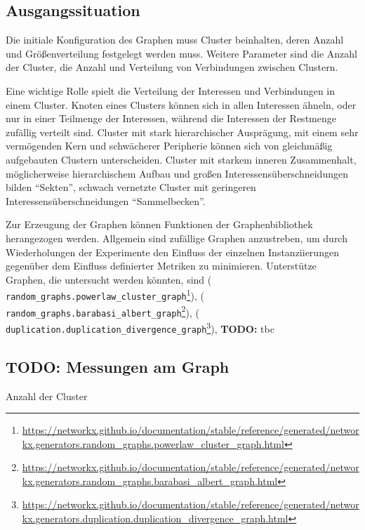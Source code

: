\documentclass[11pt, a4paper]{scrartcl}
\newcommand{\nx}[1]{\texttt{#1}}
\newcommand*{\ToDo}[1]{{\color{ToDoColor}\textbf{TODO:} #1}}
\begin{document}
\subsection{Ausgangssituation}
Die initiale Konfiguration des Graphen muss Cluster beinhalten, deren Anzahl und Größenverteilung festgelegt werden muss. Weitere Parameter sind die Anzahl der Cluster, die Anzahl und Verteilung von Verbindungen zwischen Clustern.

Eine wichtige Rolle spielt die Verteilung der Interessen und Verbindungen in einem Cluster. Knoten eines Clusters können sich in allen Interessen ähneln, oder nur in einer Teilmenge der Interessen, während die Interessen der Restmenge zufällig verteilt sind. Cluster mit stark hierarchischer Ausprägung, mit einem sehr vermögenden Kern und schwächerer Peripherie können sich von gleichmäßig aufgebauten Clustern unterscheiden. Cluster mit starkem inneren Zusammenhalt, möglicherweise hierarchischem Aufbau und großen Interessensüberschneidungen bilden "`Sekten"', schwach vernetzte Cluster mit geringeren Interessensüberschneidungen "`Sammelbecken"'.

Zur Erzeugung der Graphen können Funktionen der Graphenbibliothek \autocite{networkx} herangezogen werden. Allgemein sind zufällige Graphen anzustreben, um durch Wiederholungen der Experimente den Einfluss der einzelnen Instanziierungen gegenüber dem Einfluss definierter Metriken zu minimieren.
Unterstütze Graphen, die untersucht werden könnten, sind \autocite{Holme2002} (\nx{%
random\_graphs.powerlaw\_cluster\_graph}\footnote{\url{https://networkx.github.io/documentation/stable/reference/generated/networkx.generators.random_graphs.powerlaw_cluster_graph.html}}), \autocite{Barabasi509} (\nx{%
random\_graphs.barabasi\_albert\_graph}\footnote{\url{https://networkx.github.io/documentation/stable/reference/generated/networkx.generators.random_graphs.barabasi_albert_graph.html}}), \autocite{Ispolatov2005} (\nx{%
duplication.duplication\_divergence\_graph}\footnote{\url{https://networkx.github.io/documentation/stable/reference/generated/networkx.generators.duplication.duplication_divergence_graph.html}}), \ToDo{tbc}

\subsection{\ToDo{Messungen am Graph}}
Anzahl der Cluster
\end{document}
